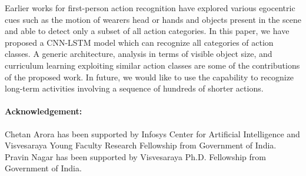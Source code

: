\documentclass{article}
\begin{document}
Earlier works for first-person action recognition have explored various egocentric cues such as the motion of wearers head or hands and objects present in the scene and able to detect only a subset of all action categories. In this paper, we have proposed a CNN-LSTM model which can recognize all categories of action classes. A generic architecture, analysis in terms of visible object size, and curriculum learning exploiting similar action classes are some of the contributions of the proposed work. In future, we would like to use the capability to recognize long-term activities involving a sequence of hundreds of shorter actions.

\paragraph*{Acknowledgement:} Chetan Arora has been supported by Infosys Center for Artificial Intelligence and Visvesaraya Young Faculty Research Fellowship from Government of India. Pravin Nagar has been supported by Visvesaraya Ph.D. Fellowship from Government of India.



\end{document}
